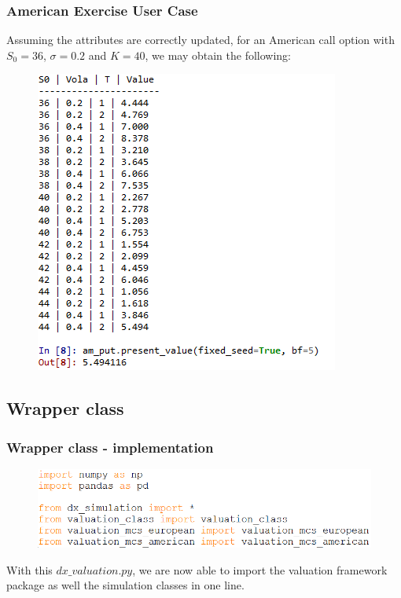 \documentclass{beamer}
\begin{document}
\begin{frame}
\frametitle{American Exercise User Case}
Assuming the attributes are correctly updated, for an American call option with $S_{0} = 36$, $\sigma = 0.2$ and $K = 40$, we may obtain the following:
\begin{figure}[H]
	\includegraphics[scale=0.6]{american_exercise_user_case.png}
\end{figure}
\end{frame}

\subsection{Wrapper class}
\begin{frame}
\frametitle{Wrapper class - implementation}
\begin{figure}[H]
	\includegraphics[scale=0.48]{wrapper_class.png}
\end{figure}
With this $dx\_valuation.py$, we are now able to import the valuation framework package as well the simulation classes in one line.
\end{frame}
\end{document}
